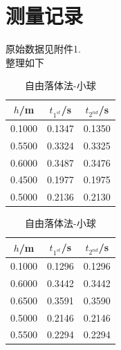 \documentclass[a4paper]{article}%
\begin{document}
\section{测量记录}
原始数据见附件1.\\整理如下

\begin{table}[H]
    \begin{minipage}{0.5\linewidth}
        \centering
        \begin{tabular}{ccc}
            \toprule
            $h$/m & $t_{1^{st}}$/s & $t_{2^{nd}}$/s\\
            \midrule
            0.1000 & 0.1347 & 0.1350 \\
            0.5500 & 0.3324 & 0.3325 \\
            0.6000 & 0.3487 & 0.3476 \\
            0.4500 & 0.1977 & 0.1975 \\
            0.5000 & 0.2136 & 0.2130 \\
            \bottomrule
        \end{tabular}
        \caption{自由落体法-圆柱}\label{圆柱}
    \end{minipage}
    \begin{minipage}{0.5\linewidth}  
        \centering
        \begin{tabular}{ccc} 
            \toprule
            $h$/m & $t_{1^{st}}$/s & $t_{2^{nd}}$/s\\
            \midrule
            0.1000 & 0.1296 & 0.1296 \\
            0.6000 & 0.3442 & 0.3442 \\
            0.6500 & 0.3591 & 0.3590 \\
            0.5000 & 0.2146 & 0.2146 \\
            0.5500 & 0.2294 & 0.2294 \\
            \bottomrule
        \end{tabular}
        \caption{自由落体法-小球}\label{小球}
    \end{minipage}
\end{table}
\end{document}
